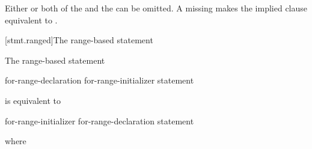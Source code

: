 \pnum
Either or both of the 
and the  can be omitted.
A missing 
makes the implied  clause
equivalent to .

[stmt.ranged]{The range-based  statement}%

\pnum
The range-based  statement
\begin{ncsimplebnf}
 \terminal{(}  for-range-declaration \terminal{:} for-range-initializer \terminal{)} statement
\end{ncsimplebnf}
is equivalent to
\begin{ncsimplebnf}
\terminal{\{}\br
\bnfindent {}\br
\bnfindent {} \terminal{\&\&} \terminal{=} for-range-initializer \terminal{;}\br
\bnfindent {}  \terminal{=}  \terminal{;}\br
\bnfindent {}  \terminal{=}  \terminal{;}\br
\bnfindent {} \terminal{(} \terminal{;}  \terminal{!=} \terminal{;} \terminal{++} \terminal{)} \terminal{\{}\br
\bnfindent\bnfindent for-range-declaration \terminal{=} \terminal{*}  \terminal{;}\br
\bnfindent\bnfindent statement\br
\bnfindent \terminal{\}}\br
\terminal{\}}
\end{ncsimplebnf}
where
